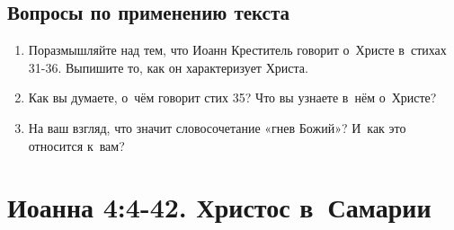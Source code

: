 \documentclass[a4paper,12pt]{article}
\begin{document}
\subsection*{Вопросы по применению текста} 
\begin{enumerate}
    \item Поразмышляйте над тем, что Иоанн Креститель говорит о~Христе в~стихах 31-36. Выпишите то, как он характеризует Христа. 
    
    \myline
    
    \myline
    \item Как вы думаете, о~чём говорит стих 35? Что вы узнаете в~нём о~Христе? 
    
    \myline
    
    \myline
    \item На ваш взгляд, что значит словосочетание «гнев Божий»? И~как это относится к~вам?
    
    \myline
    
    \myline
\end{enumerate}



\section{Иоанна 4:4-42. Христос в~Самарии}
\end{document}
